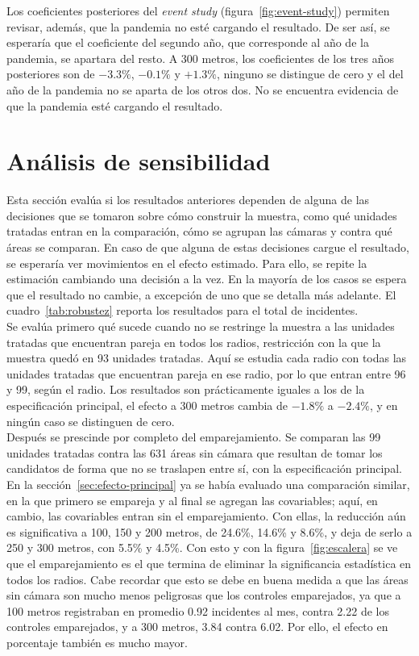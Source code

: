 Los coeficientes posteriores del \emph{event study} (figura~\ref{fig:event-study}) permiten revisar, además, que la pandemia no esté cargando el resultado. De ser así, se esperaría que el coeficiente del segundo año, que corresponde al año de la pandemia, se apartara del resto. A 300 metros, los coeficientes de los tres años posteriores son de $-3.3\%$, $-0.1\%$ y $+1.3\%$, ninguno se distingue de cero y el del año de la pandemia no se aparta de los otros dos. No se encuentra evidencia de que la pandemia esté cargando el resultado.

\section{Análisis de sensibilidad}
\label{sec:robustez}

\noindent Esta sección evalúa si los resultados anteriores dependen de alguna de las decisiones que se tomaron sobre cómo construir la muestra, como qué unidades tratadas entran en la comparación, cómo se agrupan las cámaras y contra qué áreas se comparan. En caso de que alguna de estas decisiones cargue el resultado, se esperaría ver movimientos en el efecto estimado. Para ello, se repite la estimación cambiando una decisión a la vez. En la mayoría de los casos se espera que el resultado no cambie, a excepción de uno que se detalla más adelante. El cuadro~\ref{tab:robustez} reporta los resultados para el total de incidentes.\\

Se evalúa primero qué sucede cuando no se restringe la muestra a las unidades tratadas que encuentran pareja en todos los radios, restricción con la que la muestra quedó en 93 unidades tratadas. Aquí se estudia cada radio con todas las unidades tratadas que encuentran pareja en ese radio, por lo que entran entre 96 y 99, según el radio. Los resultados son prácticamente iguales a los de la especificación principal, el efecto a 300 metros cambia de $-1.8\%$ a $-2.4\%$, y en ningún caso se distinguen de cero.\\

Después se prescinde por completo del emparejamiento. Se comparan las 99 unidades tratadas contra las 631 áreas sin cámara que resultan de tomar los candidatos de forma que no se traslapen entre sí, con la especificación principal. En la sección~\ref{sec:efecto-principal} ya se había evaluado una comparación similar, en la que primero se empareja y al final se agregan las covariables; aquí, en cambio, las covariables entran sin el emparejamiento. Con ellas, la reducción aún es significativa a 100, 150 y 200 metros, de 24.6\%, 14.6\% y 8.6\%, y deja de serlo a 250 y 300 metros, con 5.5\% y 4.5\%. Con esto y con la figura~\ref{fig:escalera} se ve que el emparejamiento es el que termina de eliminar la significancia estadística en todos los radios. Cabe recordar que esto se debe en buena medida a que las áreas sin cámara son mucho menos peligrosas que los controles emparejados, ya que a 100 metros registraban en promedio 0.92 incidentes al mes, contra 2.22 de los controles emparejados, y a 300 metros, 3.84 contra 6.02. Por ello, el efecto en porcentaje también es mucho mayor.\\

